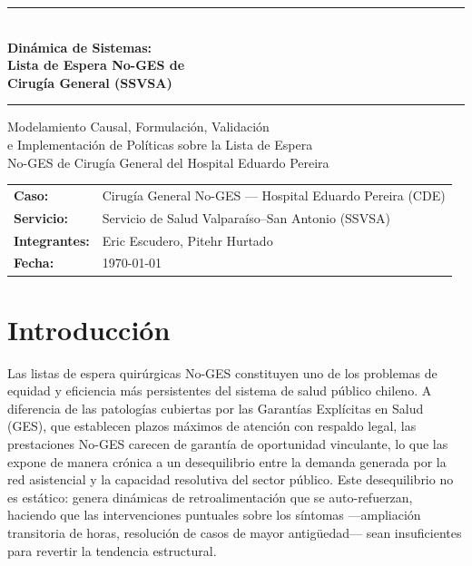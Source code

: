 \documentclass[12pt,a4paper]{article}
\begin{document}
\begin{titlepage}
  \centering
  \vspace*{1cm}
  {\color{azulDS}\rule{\linewidth}{1.5pt}}\\[0.8em]
  {\LARGE\bfseries Dinámica de Sistemas:\\[0.3em]
    Lista de Espera No-GES de\\[0.3em]
    Cirugía General (SSVSA)}\\[0.6em]
  {\color{azulDS}\rule{\linewidth}{1.5pt}}

  \vspace{2cm}
  {\large Modelamiento Causal, Formulación, Validación\\
    e Implementación de Políticas sobre la Lista de Espera\\
    No-GES de Cirugía General del Hospital Eduardo Pereira}

  \vspace{3cm}
  \begin{tabular}{ll}
    \textbf{Caso:}        & Cirugía General No-GES — Hospital Eduardo Pereira (CDE) \\[4pt]
    \textbf{Servicio:}    & Servicio de Salud Valparaíso--San Antonio (SSVSA)       \\[4pt]
    \textbf{Integrantes:} & Eric Escudero, Pitehr Hurtado                           \\[4pt]
    \textbf{Fecha:}       & \today                                                  \\[4pt]
  \end{tabular}

\end{titlepage}

\tableofcontents
\newpage

\section{Introducción}

Las listas de espera quirúrgicas No-GES constituyen uno de los problemas de equidad y eficiencia más persistentes del sistema de salud público chileno. A diferencia de las patologías cubiertas por las Garantías Explícitas en Salud (GES), que establecen plazos máximos de atención con respaldo legal, las prestaciones No-GES carecen de garantía de oportunidad vinculante, lo que las expone de manera crónica a un desequilibrio entre la demanda generada por la red asistencial y la capacidad resolutiva del sector público. Este desequilibrio no es estático: genera dinámicas de retroalimentación que se auto-refuerzan, haciendo que las intervenciones puntuales sobre los síntomas ---ampliación transitoria de horas, resolución de casos de mayor antigüedad--- sean insuficientes para revertir la tendencia estructural.
\end{document}

